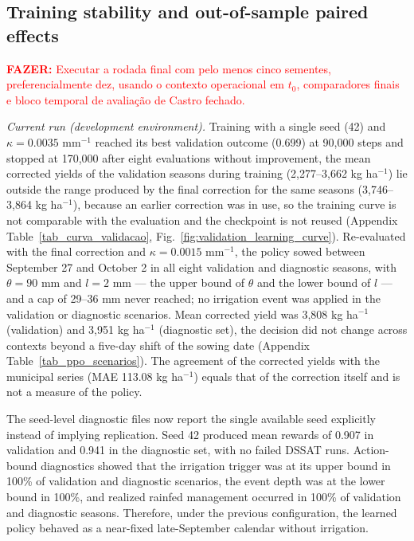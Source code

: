 \documentclass[times,final,authoryear]{elsarticle}
\begin{document}
\subsection{Training stability and out-of-sample paired effects}
\label{subres_performance}

\textcolor{red}{\textbf{FAZER:} Executar a rodada final com pelo menos cinco sementes, preferencialmente dez, usando o contexto operacional em $t_0$, comparadores finais e bloco temporal de avaliação de Castro fechado.}

\emph{Current run (development environment).} Training with a single seed (42) and $\kappa = 0.0035$ mm$^{-1}$ reached its best validation outcome (0.699) at 90,000 steps and stopped at 170,000 after eight evaluations without improvement, the mean corrected yields of the validation seasons during training (2,277--3,662 kg ha$^{-1}$) lie outside the range produced by the final correction for the same seasons (3,746--3,864 kg ha$^{-1}$), because an earlier correction was in use, so the training curve is not comparable with the evaluation and the checkpoint is not reused (Appendix Table~\ref{tab_curva_validacao}, Fig.~\ref{fig:validation_learning_curve}). Re-evaluated with the final correction and $\kappa = 0.0015$ mm$^{-1}$, the policy sowed between September 27 and October 2 in all eight validation and diagnostic seasons, with $\theta = 90$ mm and $l = 2$ mm --- the upper bound of $\theta$ and the lower bound of $l$ --- and a cap of 29--36 mm never reached; no irrigation event was applied in the validation or diagnostic scenarios. Mean corrected yield was 3,808 kg ha$^{-1}$ (validation) and 3,951 kg ha$^{-1}$ (diagnostic set), the decision did not change across contexts beyond a five-day shift of the sowing date (Appendix Table~\ref{tab_ppo_scenarios}). The agreement of the corrected yields with the municipal series (MAE 113.08 kg ha$^{-1}$) equals that of the correction itself and is not a measure of the policy.

The seed-level diagnostic files now report the single available seed explicitly instead of implying replication. Seed 42 produced mean rewards of 0.907 in validation and 0.941 in the diagnostic set, with no failed DSSAT runs. Action-bound diagnostics showed that the irrigation trigger was at its upper bound in 100\% of validation and diagnostic scenarios, the event depth was at the lower bound in 100\%, and realized rainfed management occurred in 100\% of validation and diagnostic seasons. Therefore, under the previous configuration, the learned policy behaved as a near-fixed late-September calendar without irrigation.
\end{document}
